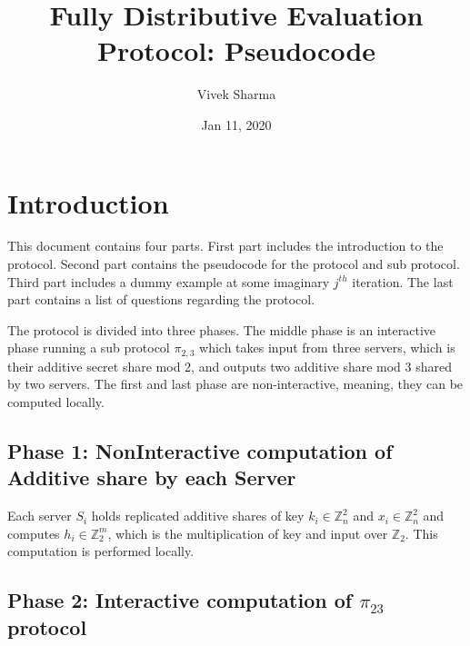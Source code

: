\documentclass[11pt]{article}
\title{Fully Distributive Evaluation Protocol: Pseudocode}
\author{Vivek Sharma}
\date{Jan 11, 2020}
\begin{document}
\maketitle


\section{Introduction}
This document contains four parts. First part includes the introduction to the protocol. Second part contains the pseudocode for the protocol and sub protocol. Third part includes a dummy example at some imaginary $j^{th}$ iteration. The last part contains a list of questions regarding the protocol.

The protocol is divided into three phases. The middle phase is an interactive phase running a sub protocol $\pi_{2,3}$ which takes input from three servers, which is their additive secret share mod 2, and outputs two additive share mod 3 shared by two servers. The first and last phase are non-interactive, meaning, they can be computed locally. 

\subsection{Phase 1: NonInteractive computation of Additive share by each Server} 
Each server $S_{i}$ holds replicated additive shares of key $k_{i} \in \mathbb{Z}_{n}^{2}$ and $x_{i} \in \mathbb{Z}_{n}^{2}$ and computes $h_{i} \in \mathbb{Z}_{2}^{m}$, which is the multiplication of key and input over $\mathbb{Z}_2$. This computation is performed locally. 
\subsection{Phase 2: Interactive computation of $\pi_{23}$ protocol}
\end{document}
